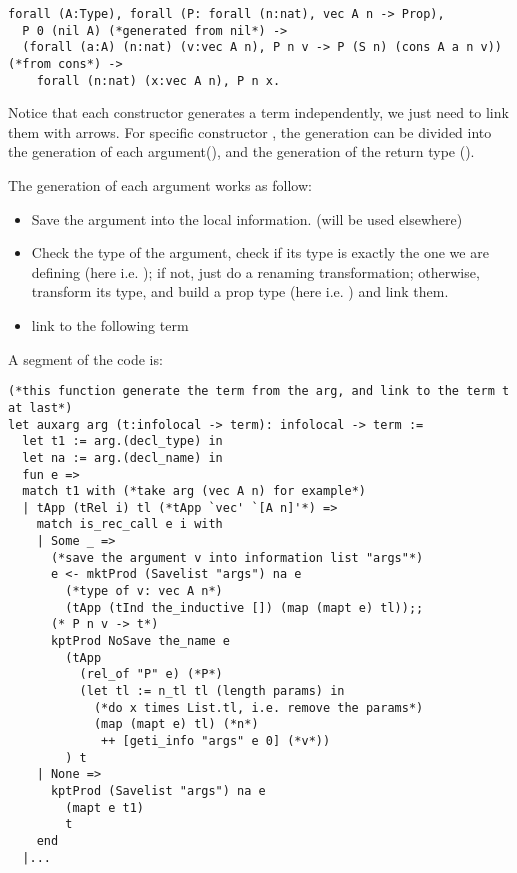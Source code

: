 \documentclass[a4paper,UKenglish,cleveref, autoref, thm-restate]{lipics-v2021}
\begin{document}
\begin{lstlisting}[language = {Coq}, basicstyle = \small]
forall (A:Type), forall (P: forall (n:nat), vec A n -> Prop),
  P 0 (nil A) (*generated from nil*) ->
  (forall (a:A) (n:nat) (v:vec A n), P n v -> P (S n) (cons A a n v)) (*from cons*) ->
    forall (n:nat) (x:vec A n), P n x.
\end{lstlisting}

Notice that each constructor generates a term independently, we just need to link them with arrows. For specific constructor , the generation can be divided into the generation of each argument(), and the generation of the return type ().

The generation of each argument works as follow:

\begin{itemize}
    \item Save the argument into the local information. (will be used elsewhere)
    \item Check the type of the argument, check if its type is exactly the one we are defining (here i.e. ); if not, just do a renaming transformation; otherwise, transform its type, and build a prop type (here i.e. ) and link them.

    \item link to the following term
\end{itemize}

A segment of the code is:

\begin{lstlisting}[language = {Coq}, basicstyle = \small]
(*this function generate the term from the arg, and link to the term t at last*)
let auxarg arg (t:infolocal -> term): infolocal -> term :=
  let t1 := arg.(decl_type) in
  let na := arg.(decl_name) in
  fun e =>
  match t1 with (*take arg (vec A n) for example*)
  | tApp (tRel i) tl (*tApp `vec' `[A n]'*) =>
    match is_rec_call e i with
    | Some _ =>
      (*save the argument v into information list "args"*)
      e <- mktProd (Savelist "args") na e
        (*type of v: vec A n*)
        (tApp (tInd the_inductive []) (map (mapt e) tl));;
      (* P n v -> t*)
      kptProd NoSave the_name e
        (tApp
          (rel_of "P" e) (*P*)
          (let tl := n_tl tl (length params) in 
            (*do x times List.tl, i.e. remove the params*)
            (map (mapt e) tl) (*n*) 
             ++ [geti_info "args" e 0] (*v*))
        ) t
    | None =>
      kptProd (Savelist "args") na e
        (mapt e t1)
        t
    end
  |...
\end{lstlisting}
\end{document}
